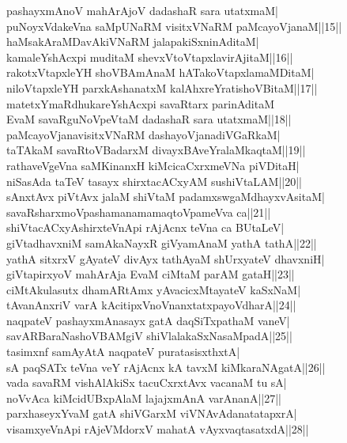 \documentclass{article}
\begin{document}
pashayxmAnoV mahArAjoV dadashaR sara utatxmaM|\\
puNoyxVdakeVna saMpUNaRM visitxVNaRM paMcayoVjanaM||15||\\
haMsakAraMDavAkiVNaRM jalapakiSxninAditaM|\\
kamaleYshAcxpi muditaM shevxVtoVtapxlavirAjitaM||16||\\
rakotxVtapxleYH shoVBAmAnaM hATakoVtapxlamaMDitaM|\\
niloVtapxleYH parxkAshanatxM kalAhxreYratishoVBitaM||17||\\
matetxYmaRdhukareYshAcxpi savaRtarx parinAditaM\\
EvaM savaRguNoVpeVtaM dadashaR sara utatxmaM||18||\\
paMcayoVjanavisitxVNaRM dashayoVjanadiVGaRkaM|\\
taTAkaM savaRtoVBadarxM divayxBAveYralaMkaqtaM||19||\\
rathaveVgeVna saMKinanxH kiMcicaCxrxmeVNa piVDitaH|\\
niSasAda taTeV tasayx shirxtacACxyAM sushiVtaLAM||20||\\
sAnxtAvx piVtAvx jalaM shiVtaM padamxswgaMdhayxvAsitaM|\\
savaRsharxmoVpashamanamamaqtoVpameVva ca||21||\\
shiVtacACxyAshirxteVnApi rAjAcnx teVna ca BUtaLeV|\\
giVtadhavxniM samAkaNayxR giVyamAnaM yathA tathA||22||\\
yathA sitxrxV gAyateV divAyx tathAyaM shUrxyateV dhavxniH|\\
giVtapirxyoV mahArAja EvaM ciMtaM parAM gataH||23||\\
ciMtAkulasutx dhamARtAmx yAvacicxMtayateV kaSxNaM|\\
tAvanAnxriV varA kAcitipxVnoVnanxtatxpayoVdharA||24||\\
naqpateV pashayxmAnasayx gatA daqSiTxpathaM vaneV|\\
savARBaraNashoVBAMgiV shiVlalakaSxNasaMpadA||25||\\
tasimxnf samAyAtA naqpateV puratasisxthxtA|\\
sA paqSATx teVna veY rAjAcnx kA tavxM kiMkaraNAgatA||26||\\
vada savaRM vishAlAkiSx tacuCxrxtAvx vacanaM tu sA|\\
noVvAca kiMcidUBxpAlaM lajajxmAnA varAnanA||27||\\
parxhaseyxYvaM gatA shiVGarxM viVNAvAdanatatapxrA|\\
visamxyeVnApi rAjeVMdorxV mahatA vAyxvaqtasatxdA||28||\\
\end{document}
